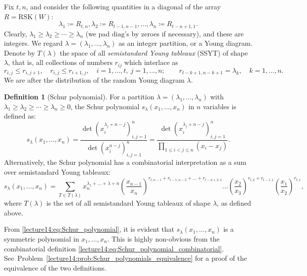 \documentclass[letterpaper,11pt,oneside,reqno]{book}
\numberwithin{equation}{chapter}  %
\theoremstyle{definition}
\newtheorem{definition}[proposition]{Definition}
\begin{document}
Fix $t,n$, and consider the following quantities
in a diagonal of the array $R=\mathrm{RSK}(W)$:
\begin{equation*}
	\lambda_1\coloneqq R_{t,n},
	\lambda_2\coloneqq R_{t-1,n-1},\ldots,
	\lambda_n\coloneqq R_{t-n+1,1}.
\end{equation*}
Clearly, $\lambda_1\ge\lambda_2\ge\cdots\ge\lambda_n$ (we pad $\mathrm{diag}$'s by zeroes if necessary),
and these are integers. We regard $\lambda=(\lambda_1,\ldots,\lambda_n)$ as an integer partition,
or a Young diagram.
Denote by $T(\lambda)$ the
space of all \emph{semistandard Young tableaux} (SSYT) of shape $\lambda$, that is,
all collections of numbers $r_{ij}$ which interlace as
\begin{equation*}
	r_{i,j}\le r_{i,j+1},\quad r_{i,j}\le r_{i+1,j},
	\quad
	i=1,\ldots,t,\ j=1,\ldots,n;
	\qquad
	r_{t-k+1,n-k+1}=\lambda_k,\quad k=1,\ldots,n.
\end{equation*}
We are after the distribution of the random Young diagram $\lambda$.

\begin{definition}[Schur polynomial]
	For a partition $\lambda=(\lambda_1,\ldots,\lambda_n)$ with $\lambda_1 \geq \lambda_2 \geq \cdots \geq \lambda_n \geq 0$, the Schur polynomial $s_\lambda(x_1,\ldots,x_n)$ in $n$ variables is defined as:
	\begin{equation}
		\label{lecture14:eq:Schur_polynomial}
		s_\lambda(x_1,\ldots,x_n) =
		\frac{\det(x_i^{\lambda_j+n-j})_{i,j=1}^n}{\det(x_i^{n-j})_{i,j=1}^n}
		= \frac{\det(x_i^{\lambda_j+n-j})_{i,j=1}^n}{\prod_{1
		\leq i < j \leq n}(x_i-x_j)}.
	\end{equation}
	Alternatively, the Schur polynomial has a combinatorial interpretation as a sum over semistandard Young tableaux:
	\begin{equation}
		\label{lecture14:eq:Schur_polynomial_combinatorial}
		s_\lambda(x_1,\ldots,x_n) = \sum_{T \in T(\lambda)}
		x_n^{\lambda_1+\ldots+\lambda+n }
		\left( \frac{x_{n-1}}{x_n} \right)^{r_{t,n-1}+r_{t-1,n-2}+\ldots+r_{t-n+2,1} }
		\ldots
		\left( \frac{x_2}{x_3} \right)^{r_{t,2}+r_{t-1,1}}
		\left( \frac{x_1}{x_2} \right)^{r_{t,1}},
	\end{equation}
	where $T(\lambda)$ is the set of all semistandard Young tableaux of shape $\lambda$,
	as defined above.
\end{definition}

From \eqref{lecture14:eq:Schur_polynomial}, it is evident that $s_\lambda(x_1,\ldots,x_n )$ is a
symmetric polynomial in $x_1,\ldots,x_n$.
This is highly non-obvious from the combinatorial definition \eqref{lecture14:eq:Schur_polynomial_combinatorial}.
See~Problem~\ref{lecture14:prob:Schur_polynomials_equivalence} for a proof of the equivalence of the two definitions.
\end{document}
